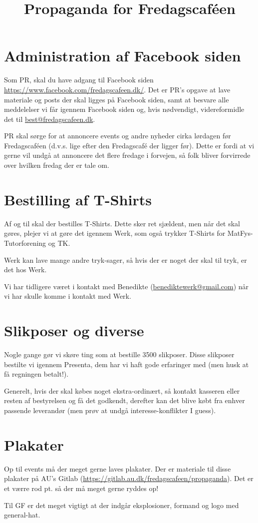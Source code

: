 

\title{Propaganda for Fredagscaféen}



\maketitle

\section{Administration af Facebook siden}
Som PR, skal du have adgang til Facebook siden \url{https://www.facebook.com/fredagscafeen.dk/}. Det er PR's opgave at lave materiale og posts der skal ligges på Facebook siden, samt at besvare alle meddelelser vi får igennem Facebook siden og, hvis nødvendigt, videreformidle det til \url{best@fredagscafeen.dk}.

PR skal sørge for at annoncere events og andre nyheder cirka lørdagen før Fredagscaféen (d.v.s. lige efter den Fredagscafé der ligger før). Dette er fordi at vi gerne vil undgå at annoncere det flere fredage i forvejen, så folk bliver forvirrede over hvilken fredag der er tale om.

\section{Bestilling af T-Shirts}
Af og til skal der bestilles T-Shirts. Dette sker ret sjældent, men når det skal gøres, plejer vi at gøre det igennem Werk, som også trykker T-Shirts for MatFys-Tutorforening og TK.

Werk kan lave mange andre tryk-sager, så hvis der er noget der skal til tryk, er det hos Werk.

Vi har tidligere været i kontakt med Benedikte (\url{benediktewerk@gmail.com}) når vi har skulle komme i kontakt med Werk.

\section{Slikposer og diverse}
Nogle gange gør vi skøre ting som at bestille 3500 slikposer. Disse slikposer bestilte vi igennem Presenta, dem har vi haft gode erfaringer med (men husk at få regningen betalt!).

Generelt, hvis der skal købes noget ekstra-ordinært, så kontakt kasseren eller resten af bestyrelsen og få det godkendt, derefter kan det blive købt fra enhver passende leverandør (men prøv at undgå interesse-konflikter I guess).

\section{Plakater}
Op til events må der meget gerne laves plakater. Der er materiale til disse plakater på AU's Gitlab (\url{https://gitlab.au.dk/fredagscafeen/propaganda}). Det er et værre rod pt. så der må meget gerne ryddes op!

Til GF er det meget vigtigt at der indgår eksplosioner, formand og logo med general-hat.

